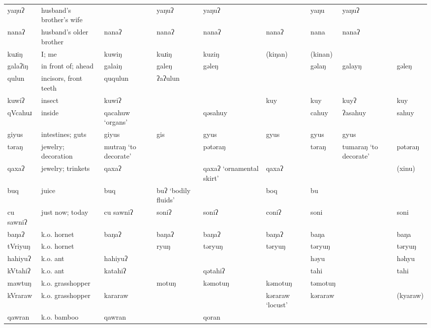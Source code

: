 \begin{landscape}
\begin{longtable}{*{9}{>{\raggedright\arraybackslash}p{}}}
\text{*}yaŋuʔ        & husband's brother's wife &  & yaŋuʔ & yaŋuʔ &  & yaŋu & yaŋuʔ & \\
\text{*}nanaʔ        & husband's older brother & nanaʔ & nanaʔ & nanaʔ & nanaʔ & nana & nanaʔ & \\
\text{*}kuɹiŋ        & I; me & kuwiŋ & kuɹiŋ & kuziŋ & (kiŋan) & (kinan) &  & \\
\text{*}galaʔiŋ      & in front of; ahead & galaiŋ & galeŋ & gəleŋ &  & gəlaŋ & galayŋ & gəleŋ\\
\text{*}qulun       & incisors, front teeth & ququlun & ʔaʔulun &  &  &  &  & \\
\text{*}kuwiʔ        & insect & kuwiʔ &  &  & kuy & kuy & kuyʔ & kuy\\
\text{*}qVcahuɹ      & inside & qacahuw \newline `organs' &  & qəsahuy &  & cahuy & ʔasahuy & sahuy\\
\text{*}giyus        & intestines; guts & giyus & gis & gyus & gyus & gyus & gyus & \\
\text{*}təraŋ        & jewelry; decoration & mutraŋ \newline `to decorate' &  & pətəraŋ &  & təraŋ & tumaraŋ \newline `to decorate' & pətəraŋ\\
\text{*}qaxaʔ        & jewelry; trinkets & qaxaʔ &  & qaxaʔ \newline `ornamental skirt' & qaxaʔ &  &  & (xinu)\\
\text{*}buq          & juice & buq & buʔ \newline `bodily fluids' &  & boq & bu &  & \\
\text{*}cu sawniʔ    & just now; today & cu sawniʔ & soniʔ & soniʔ & coniʔ & soni &  & soni\\
\text{*}baŋaʔ        & k.o. hornet & baŋaʔ & baŋaʔ & baŋaʔ & baŋaʔ & baŋa &  & baŋa\\
\text{*}tVriyuŋ      & k.o. hornet &  & ryuŋ & təryuŋ & təryuŋ & təryuŋ &  & təryuŋ\\
\text{*}hahiyuʔ      & k.o. ant & hahiyuʔ &  &  &  & həyu &  & həhyu\\
\text{*}kVtahiʔ      & k.o. ant & katahiʔ &  & qətahiʔ &  & tahi &  & tahi\\
\text{*}mawtuŋ      & k.o. grasshopper &  & motuŋ & kəmotuŋ & kəmotuŋ & təmotuŋ &  & \\
\text{*}kVraraw      & k.o. grasshopper & kararaw &  &  & kəraraw `locust' & kəraraw &  & (kyaraw)\\
\text{*}qawran       & k.o. bamboo & qawran &  & qoran &  &  &  & \\

\end{longtable}
\end{landscape}

